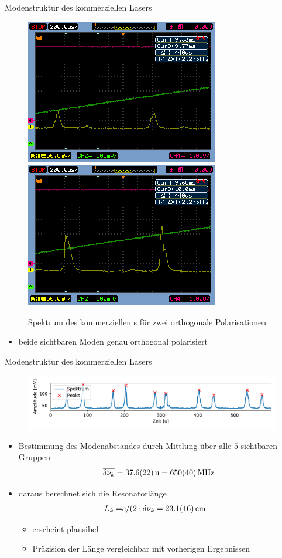 \documentclass[10pt, aspectratio=169]{beamer}
\newcommand{\hne}{\ce{HeNe}}
\begin{document}
\begin{frame}{Modenstruktur des kommerziellen Lasers}
  \begin{figure}[b]\centering
    \includegraphics[width=.3\columnwidth]{pol1.png}
    \includegraphics[width=.3\columnwidth]{pol2.png}
    \caption[Gauss]{Spektrum des kommerziellen \hne{}s f\"ur zwei
      orthogonale Polarisationen}
  \end{figure}

  \begin{itemize}
  \item beide sichtbaren Moden genau orthogonal polarisiert
  \end{itemize}
\end{frame}

\begin{frame}{Modenstruktur des kommerziellen Lasers}
  \begin{figure}[b]\centering
    \includegraphics[width=1\columnwidth]{figs/komm_all_peaks.pdf}
  \end{figure}

  \begin{itemize}
  \item<1-> Bestimmung des Modenabstandes durch Mittlung \"uber alle
    \(5\) sichtbaren Gruppen
    \begin{equation}
      \label{eq:modeabstkom}
      \overline{\delta\nu_k}=\SI{37.6\pm 2.2}{u}=\SI{650\pm 40}{\mega\hertz}
    \end{equation}
  \item<2-> daraus berechnet sich die Resonatorlänge
    \begin{align}
      L_k =& c/(2\cdot \delta\nu_k = \SI{23.1\pm 1.6}{\centi\meter}
    \end{align}
    \begin{itemize}
    \item<3-> erscheint plausibel
    \item<3-> Pr\"azision der L\"ange vergleichbar mit vorherigen
      Ergebnissen
    \end{itemize}
  \end{itemize}
\end{frame}
\end{document}

